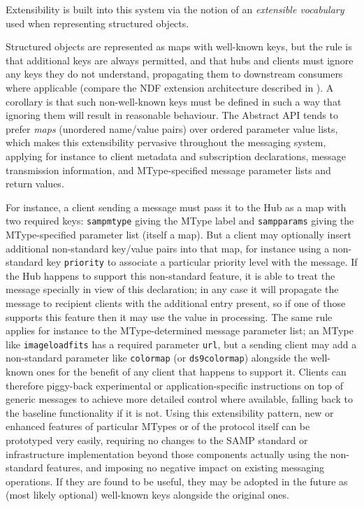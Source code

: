 \documentclass[5p]{elsarticle}
\begin{document}
Extensibility is built into this system via the notion of an
{\em extensible vocabulary} used when representing structured objects.

Structured objects are represented as maps with well-known keys,
but the rule is that additional keys are always permitted,
and that hubs and clients must ignore any keys they do not understand,
propagating them to downstream consumers where applicable
(compare the NDF extension architecture described in \citet{sgp38}).
A corollary is that such non-well-known keys must be defined in such
a way that ignoring them will result in reasonable behaviour.
The Abstract API tends to prefer {\em maps\/} (unordered name/value pairs)
over ordered parameter value lists, which makes this extensibility
pervasive throughout the messaging system,
applying for instance to
client metadata and subscription declarations,
message transmission information,
and MType-specified message parameter lists and return values.

For instance, a client sending a message must pass it to the Hub
as a map with two required keys:
{\tt samp{\kdot}mtype} giving the MType label and
{\tt samp{\kdot}params} giving the MType-specified parameter list
(itself a map).
But a client may optionally insert additional non-standard key/value pairs
into that map, for instance using a non-standard key {\tt priority}
to associate a particular priority level with the message.
If the Hub happens to support this non-standard feature,
it is able to treat the message specially in view of this declaration;
in any case it will propagate the message to recipient clients
with the additional entry present, so if one of those supports
this feature then it may use the value in processing.
The same rule applies for instance to the MType-determined
message parameter list;
an MType like {\tt image{\kdot}load{\kdot}fits}
has a required parameter {\tt url},
but a sending client may add a non-standard parameter like
{\tt colormap} (or {\tt ds9{\kdot}colormap}) alongside the well-known ones
for the benefit of any client that happens to support it.
Clients can therefore piggy-back experimental or application-specific
instructions on top of generic messages to achieve more detailed control
where available, falling back to the baseline functionality if it is not.
Using this extensibility pattern, new or enhanced features of 
particular MTypes or of the protocol itself can be prototyped 
very easily, requiring no changes to the SAMP standard or infrastructure
implementation beyond those components actually using
the non-standard features,
and imposing no negative impact on existing messaging operations.
If they are found to be useful, they may be adopted in the future
as (most likely optional) well-known keys alongside the original ones.
\end{document}

